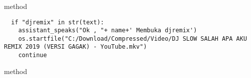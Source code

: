 \\
\\
\\
\\
\\
\\
\\
\\
\\
\\
\\
\\
\\
\\
\\
 method 
\begin{lstlisting}
  if "djremix" in str(text): 
    assistant_speaks("Ok , "+ name+' Membuka djremix')
    os.startfile("C:/Download/Compressed/Video/DJ SLOW SALAH APA AKU REMIX 2019 (VERSI GAGAK) - YouTube.mkv")
    continue
\end{lstlisting}
 method 
\\
\\
\\
\\
\\
\\
\\
\\
\\
\\
\\
\\
\\
\\
\\
\\
\\
\\
\\
\\
\\
\\
\\
\\
\\
\\
\\
\\
\\
\\
\\
\\
\\
\\
\\
\\
\\
\\
